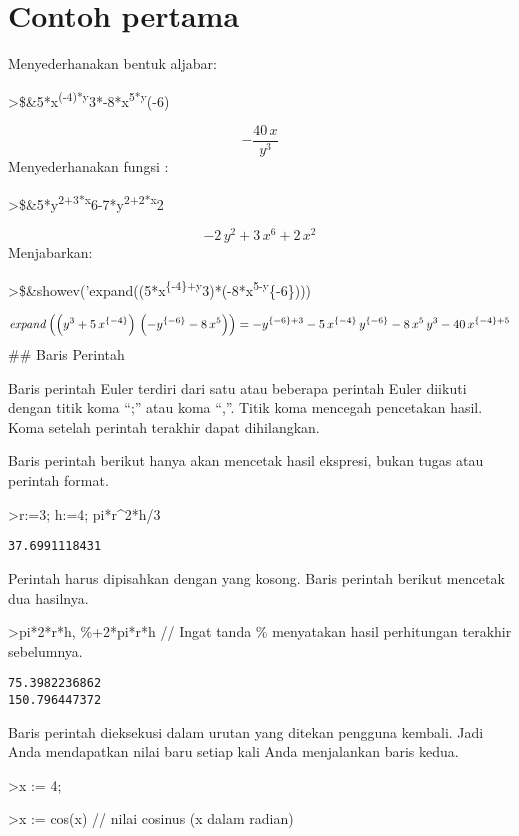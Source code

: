 \documentclass[
]{book}
\begin{document}
\section{Contoh pertama}\label{contoh-pertama}

Menyederhanakan bentuk aljabar:

\textgreater\$\&5*x\textsuperscript{(-4)*y}3*-8*x\textsuperscript{5*y}(-6)

\[-\frac{40\,x}{y^3}\]Menyederhanakan fungsi :

\textgreater\$\&5*y\textsuperscript{2+3*x}6-7*y\textsuperscript{2+2*x}2

\[-2\,y^2+3\,x^6+2\,x^2\]Menjabarkan:

\textgreater\$\&showev('expand((5*x\textsuperscript{\{-4\}+y}3)*(-8*x\textsuperscript{5-y}\{-6\})))

\[{\it expand}\left(\left(y^3+5\,x^{\left \{-4 \right \}}\right)\,
 \left(-y^{\left \{-6 \right \}}-8\,x^5\right)\right)=-y^{\left \{-6
  \right \}+3}-5\,x^{\left \{-4 \right \}}\,y^{\left \{-6 \right \}}-
 8\,x^5\,y^3-40\,x^{\left \{-4 \right \}+5}\]\#\# Baris Perintah

Baris perintah Euler terdiri dari satu atau beberapa perintah Euler diikuti dengan titik koma ``;'' atau koma ``,''. Titik koma mencegah pencetakan hasil. Koma setelah perintah terakhir dapat dihilangkan.

Baris perintah berikut hanya akan mencetak hasil ekspresi, bukan tugas atau perintah format.

\textgreater r:=3; h:=4; pi*r\^{}2*h/3

\begin{verbatim}
37.6991118431
\end{verbatim}

Perintah harus dipisahkan dengan yang kosong. Baris perintah berikut mencetak dua hasilnya.

\textgreater pi*2*r*h, \%+2*pi*r*h // Ingat tanda \% menyatakan hasil perhitungan terakhir sebelumnya.

\begin{verbatim}
75.3982236862
150.796447372
\end{verbatim}

Baris perintah dieksekusi dalam urutan yang ditekan pengguna kembali. Jadi Anda mendapatkan nilai baru setiap kali Anda menjalankan baris kedua.

\textgreater x := 4;

\textgreater x := cos(x) // nilai cosinus (x dalam radian)
\end{document}

